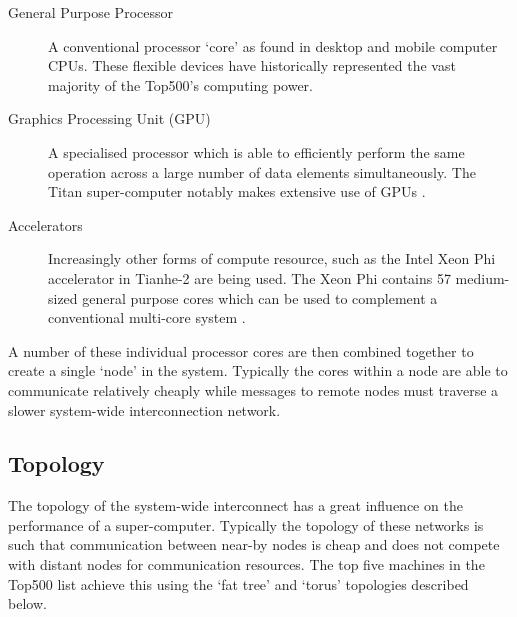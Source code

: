 			\begin{description}
				
				\item[General Purpose Processor] A conventional processor `core' as
				found in desktop and mobile computer CPUs. These flexible devices have
				historically represented the vast majority of the Top500's computing
				power.
				
				\item[Graphics Processing Unit (GPU)] A specialised processor which is
				able to efficiently perform the same operation across a large number of
				data elements simultaneously. The Titan super-computer notably makes
				extensive use of GPUs \cite{bland12}.
				
				\item[Accelerators] Increasingly other forms of compute resource, such
				as the Intel Xeon Phi accelerator in Tianhe-2 are being used. The Xeon
				Phi contains 57 medium-sized general purpose cores which can be used to
				complement a conventional multi-core system \cite{dongarra13}.
				
			\end{description}
			
			A number of these individual processor cores are then combined together to
			create a single `node' in the system. Typically the cores within a node
			are able to communicate relatively cheaply while messages to remote nodes
			must traverse a slower system-wide interconnection network.
			
		
		\subsection{Topology}
			
			
			The topology of the system-wide interconnect has a great influence on the
			performance of a super-computer. Typically the topology of these networks
			is such that communication between near-by nodes is cheap and does not
			compete with distant nodes for communication resources. The top five
			machines in the Top500 list achieve this using the `fat tree' and `torus'
			topologies described below.
			
